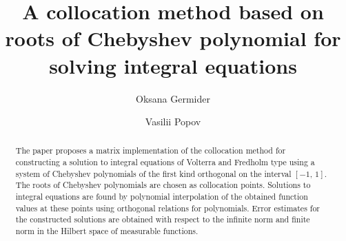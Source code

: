 \begin{englishtitle} %
\title{A collocation method based on roots of Chebyshev polynomial for solving integral equations}
\author{Oksana Germider  \and  Vasilii Popov
}

\maketitle

\begin{abstract}
The paper proposes a matrix implementation of the collocation method for constructing a solution to integral equations of Volterra and Fredholm type using a system of Chebyshev polynomials of the first kind orthogonal on the interval $[-1,\,1]$. The roots of Chebyshev polynomials are chosen as collocation points. Solutions to integral equations are found by polynomial interpolation of the obtained function values at these points using orthogonal relations for polynomials. Error estimates for the constructed solutions are obtained with respect to the infinite norm and finite norm in the Hilbert space of measurable functions.

\end{abstract}
\end{englishtitle}

\iffalse
%
%


\documentclass[12pt]{llncs}


\usepackage{iftex}

